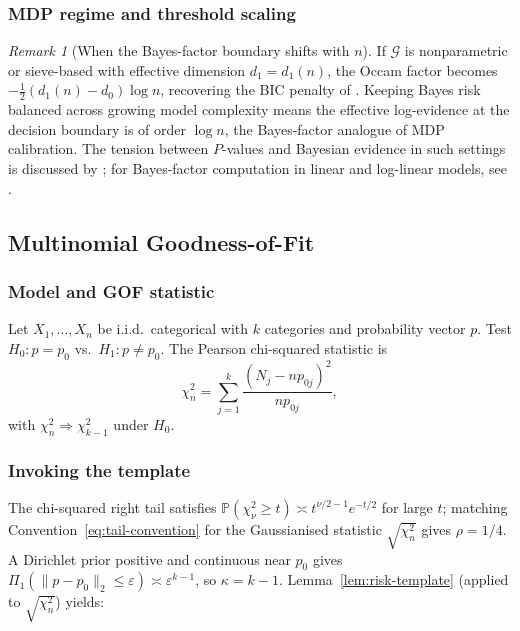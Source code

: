 \documentclass[11pt]{article}
\newcommand{\rhotail}{\rho}  %
\newcommand{\1}{\mathbf{1}}
\newcommand{\PP}{\mathbb{P}}
\theoremstyle{plain}
\theoremstyle{definition}
\theoremstyle{remark}
\newtheorem{remark}[theorem]{Remark}
\begin{document}
\subsubsection{MDP regime and threshold scaling}

\begin{remark}[When the Bayes-factor boundary shifts with $n$]
If $\mathcal{G}$ is nonparametric or sieve-based with effective dimension $d_1=d_1(n)$, the Occam factor becomes $-\tfrac{1}{2}(d_1(n)-d_0)\log n$, recovering the BIC penalty of \citet{Schwarz1978}.
Keeping Bayes risk balanced across growing model complexity means the effective log-evidence at the decision boundary is of order $\log n$, the Bayes-factor analogue of MDP calibration.
The tension between $P$-values and Bayesian evidence in such settings is discussed by \citet{BergerSellke1987}; for Bayes-factor computation in linear and log-linear models, see \citet{Spiegelhalter1980}.
\end{remark}


\subsection{Multinomial Goodness-of-Fit}\label{subsec:multinomial}

\subsubsection{Model and GOF statistic}

Let $X_1,\ldots,X_n$ be i.i.d.\ categorical with $k$ categories and probability vector $p$.
Test $H_0: p=p_0$ vs.\ $H_1: p\neq p_0$.
The Pearson chi-squared statistic is
\begin{equation}\label{eq:chi-squared}
\chi_n^2
=
\sum_{j=1}^k \frac{(N_j-np_{0j})^2}{np_{0j}},
\end{equation}
with $\chi_n^2 \Rightarrow \chi^2_{k-1}$ under $H_0$.

\subsubsection{Invoking the template}

The chi-squared right tail satisfies $\PP(\chi^2_\nu \ge t)\asymp t^{\nu/2-1}e^{-t/2}$ for large $t$; matching Convention~\eqref{eq:tail-convention} for the Gaussianised statistic $\sqrt{\chi^2_n}$ gives $\rhotail = 1/4$.
A Dirichlet prior positive and continuous near $p_0$ gives $\Pi_1(\|p-p_0\|_2\le \varepsilon)\asymp \varepsilon^{k-1}$, so $\kappa = k-1$.
Lemma~\ref{lem:risk-template} (applied to $\sqrt{\chi_n^2}$) yields:
\end{document}
